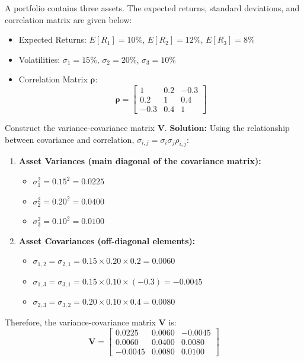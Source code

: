 \begin{tcolorbox}[
	colback=gray!5!white,
	colframe=black!15!white,
	boxrule=0.5pt,
	arc=3pt,
	title=\textbf{Example 4: A Portfolio with Three Assets (Covariance Matrix)},
	coltitle=black,
	colbacktitle=black!5!white,
	before skip=6pt,
	after skip=6pt,
	breakable
]
A portfolio contains three assets. The expected returns, standard deviations, and correlation matrix are given below:
\begin{itemize}
	\item Expected Returns: $E[R_1] = 10\%$, $E[R_2] = 12\%$, $E[R_3] = 8\%$
	\item Volatilities: $\sigma_1 = 15\%$, $\sigma_2 = 20\%$, $\sigma_3 = 10\%$
	\item Correlation Matrix $\boldsymbol{\rho}$:
	      \[
	      \boldsymbol{\rho} = \begin{bmatrix}
		      1 & 0.2 & -0.3 \\
		      0.2 & 1 & 0.4 \\
		      -0.3 & 0.4 & 1
	      \end{bmatrix}
	      \]
\end{itemize}
Construct the variance-covariance matrix $\mathbf{V}$.
\textbf{Solution:}
Using the relationship between covariance and correlation, $\sigma_{i,j} = \sigma_i \sigma_j \rho_{i,j}$:
\begin{enumerate}
	\item \textbf{Asset Variances (main diagonal of the covariance matrix):}
	      \begin{itemize}
		      \item $\sigma_1^2 = 0.15^2 = 0.0225$
		      \item $\sigma_2^2 = 0.20^2 = 0.0400$
		      \item $\sigma_3^2 = 0.10^2 = 0.0100$
	      \end{itemize}
	\item \textbf{Asset Covariances (off-diagonal elements):}
	      \begin{itemize}
		      \item $\sigma_{1,2} = \sigma_{2,1} = 0.15 \times 0.20 \times 0.2 = 0.0060$
		      \item $\sigma_{1,3} = \sigma_{3,1} = 0.15 \times 0.10 \times (-0.3) = -0.0045$
		      \item $\sigma_{2,3} = \sigma_{3,2} = 0.20 \times 0.10 \times 0.4 = 0.0080$
	      \end{itemize}
\end{enumerate}
Therefore, the variance-covariance matrix $\mathbf{V}$ is:
\[
\mathbf{V} = \begin{bmatrix}
	0.0225 & 0.0060 & -0.0045 \\
	0.0060 & 0.0400 & 0.0080 \\
	-0.0045 & 0.0080 & 0.0100
\end{bmatrix}
\]
\end{tcolorbox}
